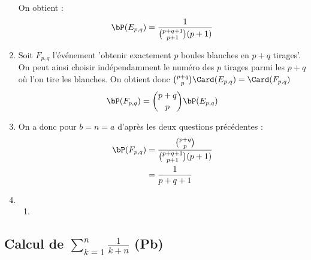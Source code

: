 \begin{correction}
\begin{enumerate}
On obtient :
$$\bP(E_{p,q}) =  \frac{1}{\binom{p+q+1}{p+1}(p+1)} $$

\item Soit $F_{p,q}$ l'événement 'obtenir exactement $p$ boules blanches en $p+q$ tirages'. On peut ainsi choisir indépendamment le numéro des $p$  tirages parmi les $p+q$ où l'on tire les blanches. On obtient donc $\binom{p+q}{p}\Card(E_{p,q})  =\Card(F_{p,q})$
$$\bP(F_{p,q}) = \binom{p+q}{p}\bP(E_{p,q})$$

\item 
 On a donc pour $b=n=a$ d'après les deux questions précédentes : 
 \begin{align*}
 \bP(F_{p,q})  & =  \frac{\binom{p+q}{p}}{\binom{p+q+1}{p+1}(p+1)}  \\
 					&= \frac{1}{p+q+1 }
 \end{align*}
 
 \item \begin{enumerate}
 \item 
  
 \end{enumerate}
\end{enumerate}
\end{correction}





\subsection{Calcul de $\sum_{k=1}^n \frac{1}{k+n}$ (Pb)}



